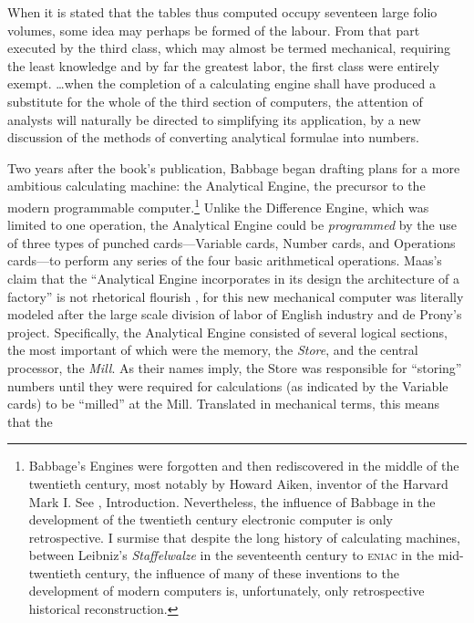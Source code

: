 \documentclass[version=last,draft=false,paper=A4,portrait,twoside=true,twocolumn=false,headinclude=false,footinclude=false,fontsize=12,BCOR=20mm,DIV=calc,pagesize=auto,titlepage=firstiscover,mpinclude=false,open=right,chapterprefix=true,numbers=autoendperiod,headsepline=false,headings=twolinechapter,parskip=false]{scrbook}
\begin{document}
\begin{displayquote}
When it is stated that the tables thus computed occupy seventeen large
folio volumes, some idea may perhaps be formed of the labour. From that
part executed by the third class, which may almost be termed mechanical,
requiring the least knowledge and by far the greatest labor, the first
class were entirely exempt. \ldots when the completion of a calculating
engine shall have produced a substitute for the whole of the third section
of computers, the attention of analysts will naturally be directed to
simplifying its application, by a new discussion of the methods of
converting analytical formulae into numbers.
\end{displayquote}

Two years after the book's publication, Babbage began drafting plans for a
more ambitious calculating machine: the Analytical Engine, the precursor to
the modern programmable computer.\footnote{Babbage's Engines were forgotten and then rediscovered in the
middle of the twentieth century, most notably by Howard Aiken, inventor of
the Harvard Mark I. See \textcite{aiken1946}, Introduction. Nevertheless, the
influence of Babbage in the development of the twentieth century electronic
computer is only retrospective. I surmise that despite the long history of
calculating machines, between Leibniz's \emph{Staffelwalze} in the seventeenth
century to \textsc{eniac} in the mid-twentieth century, the influence of
many of these inventions to the development of modern computers is,
unfortunately, only retrospective historical reconstruction.} Unlike the Difference Engine,
which was limited to one operation, the Analytical Engine could be
\emph{programmed} by the use of three types of punched cards---Variable cards,
Number cards, and Operations cards---to perform any series of the four
basic arithmetical operations. Maas's claim that the ``Analytical Engine
incorporates in its design the architecture of a factory'' is not
rhetorical flourish \autocite[109]{maas2005}, for this new mechanical
computer was literally modeled after the large scale division of labor of
English industry and de Prony's project. Specifically, the Analytical
Engine consisted of several logical sections, the most important of which
were the memory, the \emph{Store}, and the central processor, the \emph{Mill}. As their
names imply, the Store was responsible for ``storing'' numbers until they
were required for calculations (as indicated by the Variable cards) to be
``milled'' at the Mill. Translated in mechanical terms, this means that the
\end{document}
